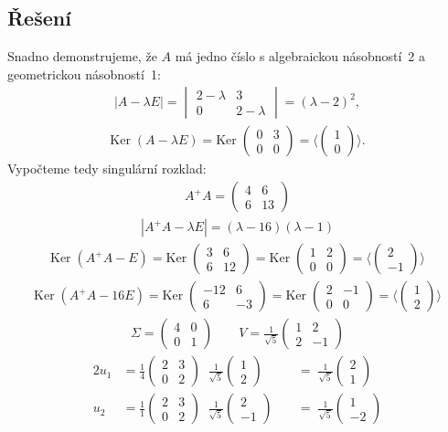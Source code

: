 \documentclass[]{article}
\newcommand{\Ker}{\mathrm{Ker}\;}
\newcommand{\mat}[1]{\begin{pmatrix}#1\end{pmatrix}}
\newcommand{\recip}[1]{\frac{1}{#1}}
\newcommand{\recipsqrt}[1]{\frac{1}{\sqrt{#1}}}
\begin{document}
\subsection{Řešení}
Snadno demonstrujeme, že $A$ má jedno číslo s algebraickou násobností~2 a geometrickou násobností~1:
\begin{align*}
  |A-\lambda E| =
  \begin{vmatrix}
    2-\lambda & 3 \\ 0 & 2-\lambda
  \end{vmatrix}
  = (\lambda - 2)^2,
\end{align*} 
\begin{align*}
  \Ker(A-\lambda E) =
  \Ker\mat{0&3\\0&0} =
  \langle\mat{1\\0}\rangle.
\end{align*}
Vypočteme tedy singulární rozklad:
\begin{align*}
  A^+A = \mat{4&6\\6&13}
\end{align*}
\begin{align*}
  |A^+A - \lambda E| = (\lambda-16)(\lambda-1)
\end{align*}
\begin{align*}
  \Ker(A^+A-E)
  = \Ker\mat{3&6\\6&12}
  = \Ker\mat{1&2\\0&0}
  = \langle\mat{2\\-1}\rangle
\end{align*}
\begin{align*}
  \Ker(A^+A-16E)
  = \Ker\mat{-12&6\\6&-3}
  = \Ker\mat{2&-1\\0&0}
  = \langle\mat{1\\2}\rangle
\end{align*}
\begin{align*}
  \Sigma = \mat{4&0\\0&1}
  \hspace{2em}
  V = \recipsqrt{5} \mat{1&2\\2&-1}
\end{align*}
\begin{alignat*}{2}
  u_1 &= \recip{4} \mat{2&3\\0&2} \;\; \recipsqrt{5} \mat{1\\2} & \;&=\; \recipsqrt{5} \mat{2\\1} \\
  u_2 &= \recip{1} \mat{2&3\\0&2} \;\; \recipsqrt{5} \mat{2\\-1} & \;&=\; \recipsqrt{5} \mat{1\\-2}
\end{alignat*}
\end{document}
